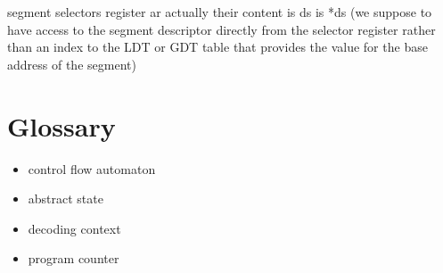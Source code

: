 \documentclass{report}
\begin{document}
segment selectors register ar actually their content is ds is *ds (we
suppose to have access to the segment descriptor directly from the
selector register rather than an index to the LDT or GDT table that
provides the value for the base address of the segment)

\chapter{Glossary}
\begin{itemize}
\item control flow automaton
\item abstract state
\item decoding context
\item program counter
\end{itemize}
\end{document}
